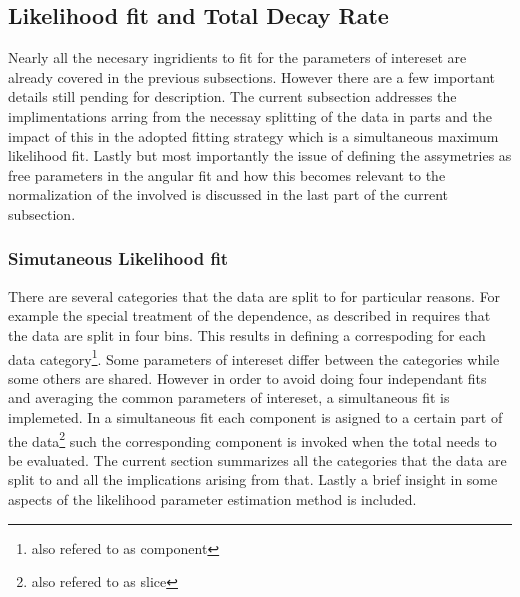 \subsection{Likelihood fit and Total Decay Rate}
\label{Total_Decay_Rate}

Nearly all the necesary ingridients to fit for the parameters of intereset are already covered in the previous subsections.
However there are a few important details still pending for description. The current subsection addresses the 
implimentations arring from the necessay splitting of the data in parts and the impact of this in the adopted
fitting strategy which is a simultaneous maximum likelihood fit. Lastly but most importantly the issue of defining the \ACP 
assymetries as free parameters in the angular fit and how this becomes relevant to the normalization of the \pdfs
involved is discussed in the last part of the current subsection.

\subsubsection{Simutaneous Likelihood fit}
\label{Simutaneous_Likelihood_fit}
There are several categories that the data are split to for particular reasons. 
For example the special treatment of the \mkpi dependence, as described in  requires that the data are
split in four \mkpi bins. This results in defining a correspoding \pdf for each data category\footnote{also refered to as component \pdf}.
Some parameters of intereset differ between the categories while some others are shared. 
However in order to avoid doing four independant fits and averaging the common parameters of intereset, 
a simultaneous fit is implemeted. In a simultaneous fit each component \pdf is asigned to a certain part of the data\footnote{also refered to as slice} 
such the corresponding component \pdf is invoked when the total \pdf needs to be evaluated. The current section summarizes
all the categories that the data are split to and all the implications arising from that. Lastly a brief insight in some aspects
of the likelihood parameter estimation method is included. 

